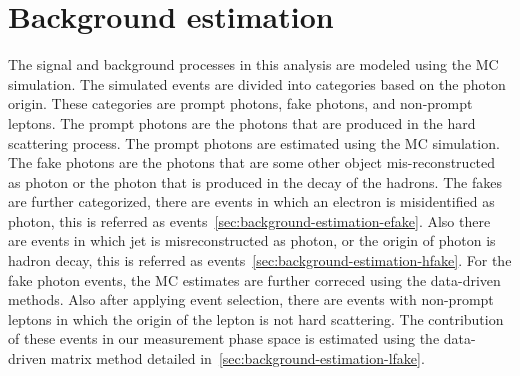 \chapter{Background estimation}
\label{chap:background_estimation}

The signal and background processes in this analysis are modeled using the MC simulation. The simulated events are divided into categories based on the photon origin. These categories are prompt photons, fake photons, and non-prompt leptons. The prompt photons are the photons that are produced in the hard scattering process. The prompt photons are estimated using the MC simulation. The fake photons are the photons that are some other object mis-reconstructed as photon or the photon that is produced in the decay of the hadrons. The fakes are further categorized, there are events in which an electron is misidentified as photon, this is referred as \efake events~\cref{sec:background-estimation-efake}. Also there are events in which jet is misreconstructed as photon, or the origin of photon is hadron decay, this is referred as \hfake events~\cref{sec:background-estimation-hfake}. For the fake photon events, the MC estimates are further correced using the data-driven methods.  Also after applying event selection, there are events with non-prompt leptons in which the origin of the lepton is not hard scattering. The contribution of these events in our measurement phase space is estimated using the data-driven matrix method detailed in~\cref{sec:background-estimation-lfake}.




